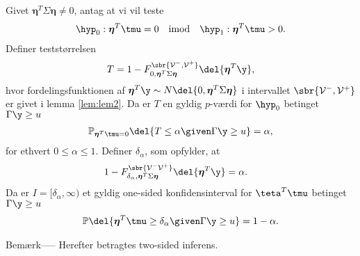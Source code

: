 \begin{lem} \label{lem:lem3}
Givet \(\boldsymbol{\eta}^T \Sigma \boldsymbol{\eta} \neq 0\), antag at vi vil teste
\begin{align*}
\hyp_0: \boldsymbol{\eta}^T \tmu=0 \quad \text{imod} \quad \hyp_1: \boldsymbol{\eta}^T \tmu > 0.
\end{align*}
Definer teststørrelsen
\begin{align}
T=1- F_{0, \boldsymbol{\eta}^T \Sigma \boldsymbol{\eta}}^{\sbr{\mathcal{V}^-, \mathcal{V}^+}} \del{\boldsymbol{\eta}^T \y}, \label{eq:post_1.14}
\end{align}
hvor fordelingsfunktionen af \(\boldsymbol{\eta}^T \y \sim N \del{0,  \boldsymbol{\eta}^T \Sigma \boldsymbol{\eta}}\) i intervallet \(\sbr{\mathcal{V}^-, \mathcal{V}^+}\) er givet i lemma \ref{lem:lem2}.
Da er \(T\) en gyldig \(p\)-værdi for \(\hyp_0\) betinget \(\Gamma \y \geq u\)
\begin{align}
\mathbb{P}_{\boldsymbol{\eta}^T \tmu=0} \del{T \leq \alpha \given \Gamma \y \geq u} = \alpha, \label{eq:post_1.15}
\end{align}
for ethvert \(0 \leq \alpha \leq 1\). 
Definer \(\delta_{\alpha}\), som opfylder, at
\begin{align*}
1-F_{\delta_{\alpha}, \boldsymbol{\eta}^T \Sigma \boldsymbol{\eta}}^{\sbr{\mathcal{V}^- \mathcal{V}^+}} \del{\boldsymbol{\eta}^T \y} &= \alpha.
\end{align*}
Da er \(I= [\delta_\alpha, \infty )\) et gyldig one-sided konfidensinterval for \(\teta^T \tmu\) betinget \(\Gamma \y \geq u\)
\begin{align*}
\mathbb{P} \del{\boldsymbol{\eta}^T \tmu \geq \delta_\alpha \given \Gamma \y \geq u} = 1- \alpha.
\end{align*}
\end{lem}
%
Bemærk-----
Herefter betragtes two-sided inferens.
%
